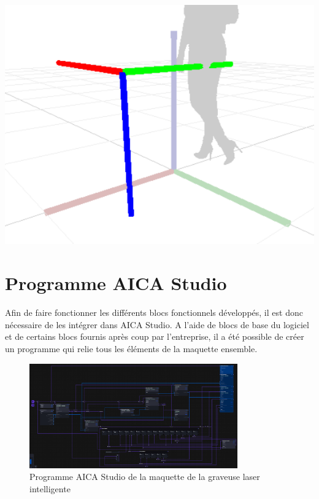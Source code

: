 \begin{minipage}{0.4\textwidth}
    \centering
    \includegraphics[width=0.95\linewidth]{assets/figures/Transform_example.png}
\end{minipage}

\section{Programme AICA Studio}
Afin de faire fonctionner les différents blocs fonctionnels développés, il est donc nécessaire de les intégrer dans AICA Studio. A l'aide de blocs de base du logiciel et de certains blocs fournis après coup par l'entreprise, il a été possible de créer un programme qui relie tous les éléments de la maquette ensemble.
\begin{figure}[H]
    \centering
    \includegraphics[width=0.8\textwidth]{assets/figures/AICA_main_app.png}
    \caption{Programme AICA Studio de la maquette de la graveuse laser intelligente}
    \label{fig:aica_programme}
\end{figure}


